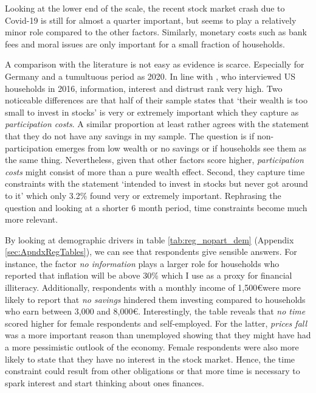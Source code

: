 \documentclass[ProjectABM]{subfiles}
\begin{document}

Looking at the lower end of the scale, the recent stock market crash due to Covid-19 is still for almost a quarter important, but seems to play a relatively minor role compared to the other factors. Similarly, monetary costs such as bank fees and moral issues are only important for a small fraction of households.



A comparison with the literature is not easy as evidence is scarce. Especially for Germany and a tumultuous period as 2020. In line with \cite{choi_2020}, who interviewed US households in 2016, information, interest and distrust rank very high. Two noticeable differences are that half of their sample states that `their wealth is too small to invest in stocks' is very or extremely important which they capture as \textit{participation costs}. A similar proportion at least rather agrees with the statement that they do not have any savings in my sample. The question is if non-participation emerges from low wealth or no savings or if households see them as the same thing. Nevertheless, given that other factors score higher, \textit{participation costs} might consist of more than a pure wealth effect. Second, they capture time constraints with the statement `intended to invest in stocks but never got around to it' which only 3.2\% found very or extremely important. Rephrasing the question and looking at a shorter 6 month period, time constraints become much more relevant.


By looking at demographic drivers in table \ref{tab:reg_nopart_dem} (Appendix \ref{sec:ApndxRegTables}), we can see that respondents give sensible answers. For instance, the factor \textit{no information} plays a larger role for households who reported that inflation will be above 30\% which I use as a proxy for financial illiteracy. Additionally, respondents with a monthly income of 1,500\euro were more likely to report that \textit{no savings} hindered them investing compared to households who earn between 3,000 and 8,000\euro. Interestingly, the table reveals that \textit{no time} scored higher for female respondents and self-employed. For the latter, \textit{prices fall} was a more important reason than unemployed showing that they might have had a more pessimistic outlook of the economy. Female respondents were also more likely to state that they have no interest in the stock market. Hence, the time constraint could result from other obligations or that more time is necessary to spark interest and start thinking about ones finances.
\end{document}
